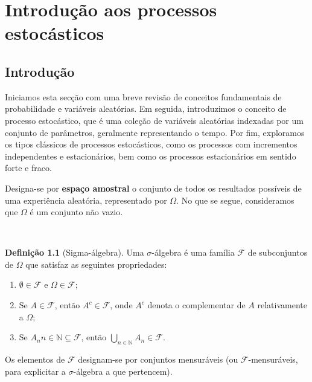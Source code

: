\documentclass[
  11pt,
  a4paper,
]{book}
\theoremstyle{definition}
\newtheorem{definition}{Definição}[chapter]
\theoremstyle{definition}
\theoremstyle{definition}
\theoremstyle{definition}
\theoremstyle{remark}
\begin{document}
\chapter{Introdução aos processos estocásticos}\label{introduuxe7uxe3o-aos-processos-estocuxe1sticos}

\section{Introdução}\label{introduuxe7uxe3o}

Iniciamos esta secção com uma breve revisão de conceitos fundamentais de probabilidade e variáveis aleatórias. Em seguida, introduzimos o conceito de processo estocástico, que é uma coleção de variáveis aleatórias indexadas por um conjunto de parâmetros, geralmente representando o tempo. Por fim, exploramos os tipos clássicos de processos estocásticos, como os processos com incrementos independentes e estacionários, bem como os processos estacionários em sentido forte e fraco.

Designa-se por \textbf{espaço amostral} o conjunto de todos os resultados possíveis de uma experiência aleatória, representado por \(\Omega\). No que se segue, consideramos que \(\Omega\) é um conjunto não vazio.

\(\,\)

\begin{definition}[Sigma-álgebra]
Uma \(\sigma\)-álgebra é uma família \(\mathcal{F}\) de subconjuntos de \(\Omega\) que satisfaz as seguintes propriedades:

\begin{enumerate}
\def\labelenumi{\roman{enumi})}
\item
  \(\emptyset \in \mathcal{F}\) e \(\Omega \in \mathcal{F}\);
\item
  Se \(A \in \mathcal{F}\), então \(A^c \in \mathcal{F}\), onde \(A^c\) denota o complementar de \(A\) relativamente a \(\Omega\);
\item
  Se \({A_n}{n \in \mathbb{N}} \subseteq \mathcal{F}\), então \(\displaystyle \bigcup_{n \in \mathbb{N}} A_n \in \mathcal{F}\).
\end{enumerate}

Os elementos de \(\mathcal{F}\) designam-se por conjuntos mensuráveis (ou \(\mathcal{F}\)-mensuráveis, para explicitar a \(\sigma\)-álgebra a que pertencem).
\end{definition}

\(\,\)
\end{document}
